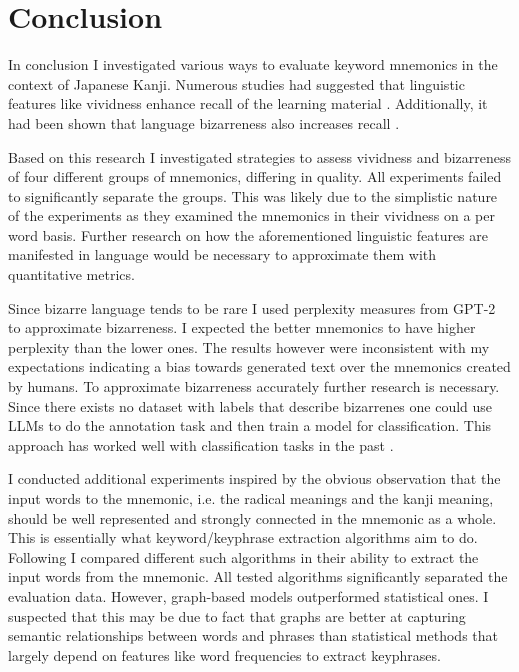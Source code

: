 \section{Conclusion} \label{sec:conclusion}
In conclusion I investigated various ways to evaluate keyword mnemonics in the context of Japanese Kanji. Numerous studies had suggested that linguistic features like vividness enhance recall of the learning material \cite{campos_2004, campos_2011, kordjazi2014effect}. Additionally, it had been shown that language bizarreness also increases recall \cite{bizzare_obrian, mahdi2018effect}. 

Based on this research I investigated strategies to assess vividness and bizarreness of four different groups of mnemonics, differing in quality. All experiments failed to significantly separate the groups. This was likely due to the simplistic nature of the experiments as they examined the mnemonics in their vividness on a per word basis. Further research on how the aforementioned linguistic features are manifested in language would be necessary to approximate them with quantitative metrics.

Since bizarre language tends to be rare I used perplexity measures from GPT-2 to approximate bizarreness. I expected the better mnemonics to have higher perplexity than the lower ones. The results however were inconsistent with my expectations indicating a bias towards generated text over the mnemonics created by humans. To approximate bizarreness accurately further research is necessary. Since there exists no dataset with labels that describe bizarrenes one could use LLMs to do the annotation task and then train a model for classification. This approach has worked well with classification tasks in the past \cite{ding2022gpt3}. 

I conducted additional experiments inspired by the obvious observation that the input words to the mnemonic, i.e. the radical meanings and the kanji meaning, should be well represented and strongly connected in the mnemonic as a whole. This is essentially what keyword/keyphrase extraction algorithms aim to do. Following I compared different such algorithms in their ability to extract the input words from the mnemonic. All tested algorithms significantly separated the evaluation data. However, graph-based models outperformed statistical ones. I suspected that this may be due to fact that graphs are better at capturing semantic relationships between words and phrases than statistical methods that largely depend on features like word frequencies to extract keyphrases. 

